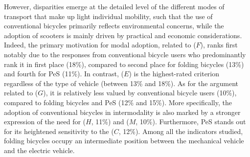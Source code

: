 \begin{refsegment}
However, disparities emerge at the detailed level of the different modes of transport that make up light individual mobility, such that the use of conventional bicycles primarily reflects environmental concerns, while the adoption of scooters is mainly driven by practical and economic considerations. Indeed, the primary motivation for modal adoption, related to  (\(F\)), ranks first notably due to the responses from conventional bicycle users who predominantly rank it in first place (18\%), compared to second place for folding bicycles (13\%) and fourth for \acrshort{PeS} (11\%). In contrast,  (\(E\)) is the highest-rated criterion regardless of the type of vehicle (between 13\% and 18\%). As for the argument related to  (\(G\)), it is relatively less valued by conventional bicycle users (10\%), compared to folding bicycles and \acrshort{PeS} (12\% and 15\%). More specifically, the adoption of conventional bicycles in intermodality is also marked by a stronger expression of the need for  (\(H\), 11\%) and  (\(M\), 10\%). Furthermore, \acrshort{PeS} stands out for its heightened sensitivity to the  (\(C\), 12\%). Among all the indicators studied, folding bicycles occupy an intermediate position between the mechanical vehicle and the electric vehicle.%


\end{refsegment}
